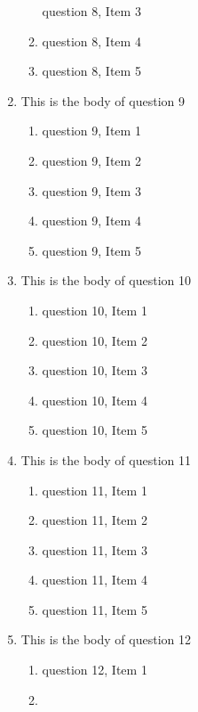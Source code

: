 \documentclass{article}
\begin{document}
\begin{enumerate}
\begin{enumerate}
    question 8, Item 3
    \item
    question 8, Item 4
    \item
    question 8, Item 5
    \end{enumerate}
\item
This is the body of question 9
    \begin{enumerate}
    \item
    question 9, Item 1
    \item
    question 9, Item 2
    \item
    question 9, Item 3
    \item
    question 9, Item 4
    \item
    question 9, Item 5
    \end{enumerate}
\item
This is the body of question 10
    \begin{enumerate}
    \item
    question 10, Item 1
    \item
    question 10, Item 2
    \item
    question 10, Item 3
    \item
    question 10, Item 4
    \item
    question 10, Item 5
    \end{enumerate}
\item
This is the body of question 11
    \begin{enumerate}
    \item
    question 11, Item 1
    \item
    question 11, Item 2
    \item
    question 11, Item 3
    \item
    question 11, Item 4
    \item
    question 11, Item 5
    \end{enumerate}
\item
This is the body of question 12
    \begin{enumerate}
    \item
    question 12, Item 1
    \item

\end{enumerate}
\end{enumerate}
\end{document}
